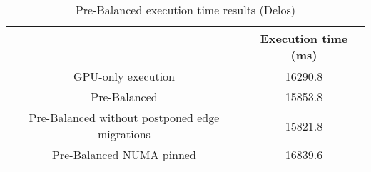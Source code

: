 \begin{table}[h!]
  \centering
  \begin{tabular}{||c | c||} 
   \hline
    & Execution time (ms) \\ [0.5ex] 
   \hline\hline
   GPU-only execution & 16290.8 \\
   Pre-Balanced & 15853.8 \\ 
   Pre-Balanced without postponed edge migrations & 15821.8 \\
   Pre-Balanced NUMA pinned & 16839.6 \\ [1ex] 
   \hline
  \end{tabular}
  \caption{Pre-Balanced execution time results (Delos)}
  \label{table:preb_delos}
\end{table}